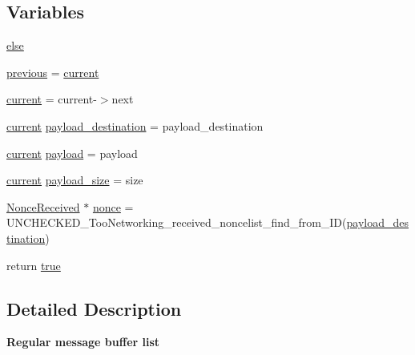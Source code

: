 \subsection*{Variables}
\begin{DoxyCompactItemize}
\item 
\hyperlink{group__UNCHECKED__TooNetworking__SIMPLE__BUFFER_ga0544c3fe466e421738dae463968b70ba}{else}
\item 
\hyperlink{group__UNCHECKED__TooNetworking__SIMPLE__BUFFER_gaf1966d7084d2373905ae510e8f04a581}{previous} = \hyperlink{group__UNCHECKED__TooNetworking__SIMPLE__BUFFER_gae8b515cceb310a575b6c2677ba93ea7e}{current}
\item 
\hyperlink{group__UNCHECKED__TooNetworking__SIMPLE__BUFFER_gae8b515cceb310a575b6c2677ba93ea7e}{current} = current-\/$>$next
\item 
\hyperlink{group__UNCHECKED__TooNetworking__SIMPLE__BUFFER_gae8b515cceb310a575b6c2677ba93ea7e}{current} \hyperlink{group__UNCHECKED__TooNetworking__SIMPLE__BUFFER_ga76db772dc25d4b2f5eb800e93ca3fd0b}{payload\+\_\+destination} = payload\+\_\+destination
\item 
\hyperlink{group__UNCHECKED__TooNetworking__SIMPLE__BUFFER_gae8b515cceb310a575b6c2677ba93ea7e}{current} \hyperlink{group__UNCHECKED__TooNetworking__SIMPLE__BUFFER_ga373c8264cc39aeb3105d87e2b20dd971}{payload} = payload
\item 
\hyperlink{group__UNCHECKED__TooNetworking__SIMPLE__BUFFER_gae8b515cceb310a575b6c2677ba93ea7e}{current} \hyperlink{group__UNCHECKED__TooNetworking__SIMPLE__BUFFER_gaca16f9091ec66e37bff7fc67b75eba73}{payload\+\_\+size} = size
\item 
\hyperlink{structNonceReceived}{Nonce\+Received} $\ast$ \hyperlink{group__UNCHECKED__TooNetworking__SIMPLE__BUFFER_ga8fc64ce47dc28f47b3317ae1051e4359}{nonce} = U\+N\+C\+H\+E\+C\+K\+E\+D\+\_\+\+Too\+Networking\+\_\+received\+\_\+noncelist\+\_\+find\+\_\+from\+\_\+\+ID(\hyperlink{group__UNCHECKED__TooNetworking__SIMPLE__BUFFER_ga76db772dc25d4b2f5eb800e93ca3fd0b}{payload\+\_\+destination})
\item 
return \hyperlink{group__UNCHECKED__TooNetworking__SIMPLE__BUFFER_ga930920b2bc42824a5c03be681830f4b2}{true}
\end{DoxyCompactItemize}


\subsection{Detailed Description}
{\bfseries Regular message buffer list} 

